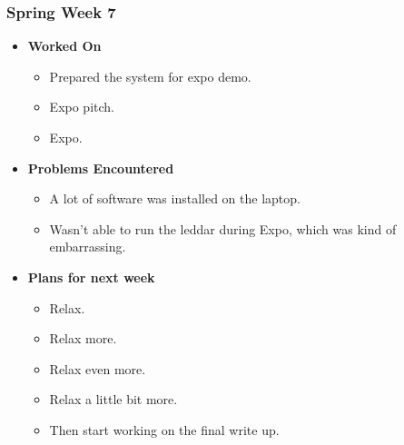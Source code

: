 \documentclass[compsoc,draftclsnofoot,onecolumn,10pt]{IEEEtran}
\begin{document}
\subsubsection{Spring Week 7}
\begin{itemize}
    \item {\textbf{Worked On}}
    \begin{itemize}
      \item Prepared the system for expo demo.
      \item Expo pitch.
      \item Expo.
    \end{itemize}

    \item {\textbf{Problems Encountered}}
    \begin{itemize}
      \item A lot of software was installed on the laptop.
      \item Wasn't able to run the leddar during Expo, which was kind
      of embarrassing.
    \end{itemize}

    \item{\textbf{Plans for next week}}
    \begin{itemize}
      \item Relax.
      \item Relax more.
      \item Relax even more.
      \item Relax a little bit more.
      \item Then start working on the final write up.
    \end{itemize}

\end{itemize}
\end{document}
